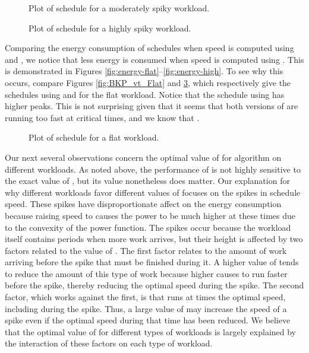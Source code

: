 \documentclass[11pt]{article}
\begin{document}
\begin{figure}
\centering
{}
\caption{Plot of   schedule for a moderately spiky workload.}
\label{fig:BKP_vt_Moderate}
\end{figure}

\begin{figure}
\centering
{}
\caption{Plot of   schedule for a highly spiky workload.}
\label{fig:BKP_vt_High}
\end{figure}

Comparing the energy consumption of  schedules when speed is
computed using  and , we notice that less energy is
consumed when speed is computed using .
This is demonstrated in
Figures \ref{fig:energy-flat}--\ref{fig:energy-high}.
To see why this occurs, compare Figures \ref{fig:BKP_vt_Flat} and
\ref{fig:BKP_pt_Flat}, which respectively give the 
 schedules using  and  for the flat workload.
Notice that the schedule using  has higher peaks.
This is not surprising given that it seems that both versions of   are
running too fast at critical times, and we know that .

\begin{figure}
\centering
{}
\caption{Plot of   schedule for a flat workload.}
\label{fig:BKP_pt_Flat}
\end{figure}

Our next several observations concern the optimal value of  for
algorithm  on different workloads.
As noted above, the performance of  is not highly
sensitive to the exact value of , but its value nonetheless
does matter.
Our explanation for why different workloads favor different values of
 focuses on the spikes in schedule speed.
These spikes have disproportionate affect on the energy consumption because
raising speed to  causes the power to be much higher at
these times due to the convexity of the power function.
The spikes occur because the workload itself contains periods when more work
arrives, but their height is affected by two factors related to the
value of .
The first factor relates to the amount of work arriving before the spike
that must be finished during it.
A higher value of  tends to reduce the amount of this type of work
because higher  causes  to
run faster before the spike, thereby reducing the optimal speed during
the spike.
The second factor, which works against the first, is that  runs
at  times the optimal speed, including during the spike.
Thus, a large value of  may increase the speed of a spike even if
the optimal speed during that time has been reduced.
We believe that the optimal value of  for different types of
workloads is largely explained by the interaction of these factors on
each type of workload. 
\end{document}
